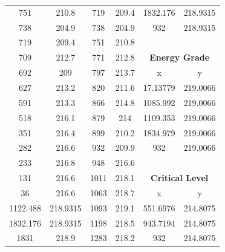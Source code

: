 \begin{center}
\begin{tabular}{|cc||cc||cc|}
    751      & 210.8                    & 719  & 209.4                         & 1832.176 & 218.9315                            \\
    738      & 204.9                    & 738  & 204.9                         & 932      & \multicolumn{1}{l|}{218.9315}       \\
    719      & 209.4                    & 751  & 210.8                         &          &                                     \\
    709      & 212.7                    & 771  & 212.8                         & \multicolumn{2}{c|}{\textbf{Energy Grade }}    \\ 
    \cline{5-6}
    692      & 209                      & 797  & 213.7                         & x        & y                                   \\
    627      & 213.2                    & 820  & 211.6                         & 17.13779 & 219.0066                            \\
    591      & 213.3                    & 866  & 214.8                         & 1085.992 & 219.0066                            \\
    518      & 216.1                    & 879  & 214                           & 1109.353 & \multicolumn{1}{l|}{219.0066}       \\
    351      & 216.4                    & 899  & 210.2                         & 1834.979 & 219.0066                            \\
    282      & 216.6                    & 932  & 209.9                         & 932      & \multicolumn{1}{l|}{219.0066}       \\
    233      & 216.8                    & 948  & 216.6                         &          &                                     \\
    131      & 216.6                    & 1011 & 218.1                         & \multicolumn{2}{c|}{\textbf{Critical Level }}  \\ 
    \cline{5-6}
    36       & 216.6                    & 1063 & 218.7                         & x        & y                                   \\
    1122.488 & 218.9315                 & 1093 & 219.1                         & 551.6976 & 214.8075                            \\
    1832.176 & 218.9315                 & 1198 & 218.5                         & 943.7194 & 214.8075                            \\
    1831     & 218.9                    & 1283 & 218.2                         & 932      & 214.8075                            \\

\end{tabular}
\end{center}
